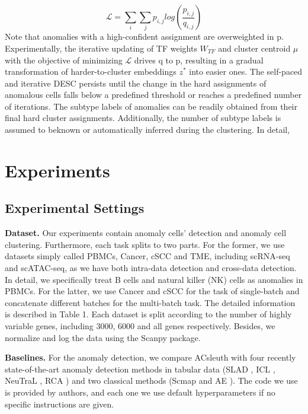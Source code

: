 \documentclass{article}
\begin{document}
\begin{equation}
    \mathcal{L}=\sum_{i}{\sum_{j} p_{i,j}log\left(\frac{p_{i,j}}{q_{i,j}}\right)}
\end{equation}
Note that anomalies with a high-confident assignment are overweighted in p. 
Experimentally, the iterative updating of TF weights $W_{TF}$ and cluster 
centroid $\mu$ with the objective of minimizing $\mathcal{L}$ drives q to p, 
resulting in a gradual transformation of harder-to-cluster embeddings 
$z^\ast$ into easier ones. The self-paced and iterative DESC persists until the 
change in the hard assignments of anomalous cells falls below a predefined threshold or 
reaches a predefined number of iterations. The subtype labels of anomalies can be readily 
obtained from their final hard cluster assignments. Additionally, the number of subtype 
labels is assumed to beknown or automatically inferred during the clustering. In detail, 

\section{Experiments}
\subsection{Experimental Settings}
\textbf{Dataset.}	Our experiments contain anomaly cells’ detection and anomaly cell 
clustering. Furthermore, each task splits to two parts. For the former, we use datasets 
simply called PBMCs, Cancer, cSCC and TME, including scRNA-seq and scATAC-seq, as we have both 
intra-data detection and cross-data detection. In detail, we specifically treat B cells 
and natural killer (NK) cells as anomalies in PBMCs. For the latter, we use Cancer and cSCC for 
the task of single-batch and concatenate different batches for the multi-batch task. The 
detailed information is described in Table 1. Each dataset is split according to the 
number of highly variable genes, including 3000, 6000 and all genes respectively. Besides, 
we normalize and log the data using the Scanpy \cite{scanpy} package.

\textbf{Baselines.} For the anomaly detection, we compare ACsleuth with four recently 
state-of-the-art anomaly detection methods in tabular data (SLAD \cite{SLAD}, 
ICL \cite{ICL}, NeuTraL \cite{NeuTraL}, RCA \cite{RCA}) and two 
classical methods (Scmap \cite{scmap} and AE \cite{AE}). The code 
we use is provided by authors, and each one we use default hyperparameters if no specific 
instructions are given.
\end{document}
